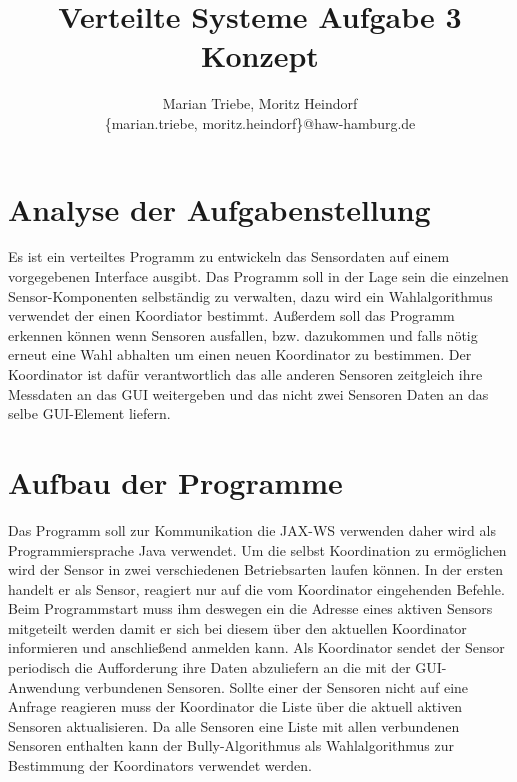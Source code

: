 \documentclass{article}
\begin{document}
\date{}

\title{Verteilte Systeme Aufgabe 3 Konzept}

\author{
  Marian Triebe, Moritz Heindorf\\
  \{marian.triebe, moritz.heindorf\}@haw-hamburg.de
}

\maketitle

\section{Analyse der Aufgabenstellung}
Es ist ein verteiltes Programm zu entwickeln das Sensordaten auf einem vorgegebenen Interface ausgibt.
Das Programm soll in der Lage sein die einzelnen Sensor-Komponenten selbständig zu verwalten, dazu wird ein Wahlalgorithmus verwendet der einen Koordiator bestimmt.
Außerdem soll das Programm erkennen können wenn Sensoren ausfallen, bzw. dazukommen und falls nötig erneut eine Wahl abhalten um einen neuen Koordinator zu bestimmen.
Der Koordinator ist dafür verantwortlich das alle anderen Sensoren zeitgleich ihre Messdaten an das GUI weitergeben und das nicht zwei Sensoren Daten an das selbe GUI-Element liefern.

\section{Aufbau der Programme}
Das Programm soll zur Kommunikation die JAX-WS verwenden daher wird als Programmiersprache Java verwendet. Um die selbst Koordination zu ermöglichen wird der Sensor in zwei verschiedenen Betriebsarten laufen können. In der ersten handelt er als Sensor,
reagiert nur auf die vom Koordinator eingehenden Befehle. Beim Programmstart muss ihm deswegen ein die Adresse eines aktiven Sensors mitgeteilt werden damit er sich bei diesem über den aktuellen Koordinator informieren und anschließend anmelden kann.
Als Koordinator sendet der Sensor periodisch die Aufforderung ihre Daten abzuliefern an die mit der GUI-Anwendung verbundenen Sensoren. Sollte einer der Sensoren nicht auf eine Anfrage reagieren muss der Koordinator die Liste über die aktuell aktiven Sensoren aktualisieren.
Da alle Sensoren eine Liste mit allen verbundenen Sensoren enthalten kann der Bully-Algorithmus als Wahlalgorithmus zur Bestimmung der Koordinators verwendet werden.
\end{document}
